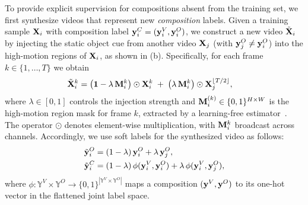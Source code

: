 


To provide explicit supervision for compositions absent from the training set, we first synthesize videos that represent new \emph{composition} labels.
Given a training sample $\mathbf{X}_i$ with composition label $\mathbf{y}_i^C=(\mathbf{y}_i^V,\mathbf{y}_i^O)$, we construct a new video $\tilde{\mathbf{X}}_i$ by injecting the static object cue from another video $\mathbf{X}_j$ (with $\mathbf{y}_j^O \neq \mathbf{y}_i^O$) into the high-motion regions of $\mathbf{X}_i$, as shown in  (b).
Specifically, for each frame $k\in\{1,\ldots,T\}$ we obtain
\begin{align}
\tilde{\mathbf{X}}_i^{k}
&= \bigl(\mathbf{1}-\lambda\,\mathbf{M}_i^{k} \bigr)\odot \mathbf{X}_i^{k}
\;+\;
\bigl(\lambda\,\mathbf{M}_i^{k}\bigr)\odot \mathbf{X}_j^{\lfloor T/2 \rfloor},
\label{eq:voca}
\end{align}
where $\lambda\in[0,1]$ controls the injection strength and $\mathbf{M}_i^{(k)}\in\{0,1\}^{H\times W}$ is the high-motion region mask for frame $k$, extracted by a learning-free estimator~\cite{ding2022fame}.
The operator $\odot$ denotes element-wise multiplication, with $\mathbf{M}_i^{k}$ broadcast across channels.
Accordingly, we use soft labels for the synthesized video as follows:
\begin{align}
\tilde{\mathbf{y}}^O_i &= (1-\lambda)\,\mathbf{y}_i^O + \lambda\,\mathbf{y}_j^O, \\
\tilde{\mathbf{y}}^C_i &= (1-\lambda)\,\phi(\mathbf{y}_i^V,\mathbf{y}_i^O) + \lambda\,\phi(\mathbf{y}_i^V,\mathbf{y}_j^O),
\label{eq:voca_label}
\end{align}
where $\phi:\mathbb{Y}^V \times \mathbb{Y}^O \rightarrow \{0,1\}^{|\mathbb{Y}^V \times \mathbb{Y}^O|}$ maps a composition $(\mathbf{y}^V,\mathbf{y}^O)$ to its one-hot vector in the flattened joint label space.



